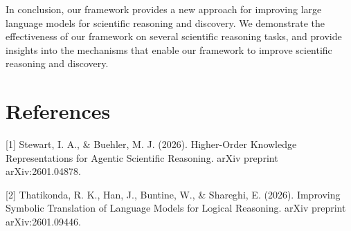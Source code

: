 \documentclass{article}
\begin{document}
In conclusion, our framework provides a new approach for improving large language models for scientific reasoning and discovery. We demonstrate the effectiveness of our framework on several scientific reasoning tasks, and provide insights into the mechanisms that enable our framework to improve scientific reasoning and discovery.

\section{References}

[1] Stewart, I. A., \& Buehler, M. J. (2026). Higher-Order Knowledge Representations for Agentic Scientific Reasoning. arXiv preprint arXiv:2601.04878.

[2] Thatikonda, R. K., Han, J., Buntine, W., \& Shareghi, E. (2026). Improving Symbolic Translation of Language Models for Logical Reasoning. arXiv preprint arXiv:2601.09446.
\end{document}

